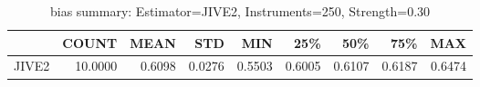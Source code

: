 \begin{table}[ht]
\centering
\caption{bias summary: Estimator=JIVE2, Instruments=250, Strength=0.30}
\begin{tabular}{lrrrrrrrr}
\toprule
 & COUNT & MEAN & STD & MIN & 25\% & 50\% & 75\% & MAX \\
\midrule
JIVE2 & 10.0000 & 0.6098 & 0.0276 & 0.5503 & 0.6005 & 0.6107 & 0.6187 & 0.6474 \\
\bottomrule
\end{tabular}
\end{table}
